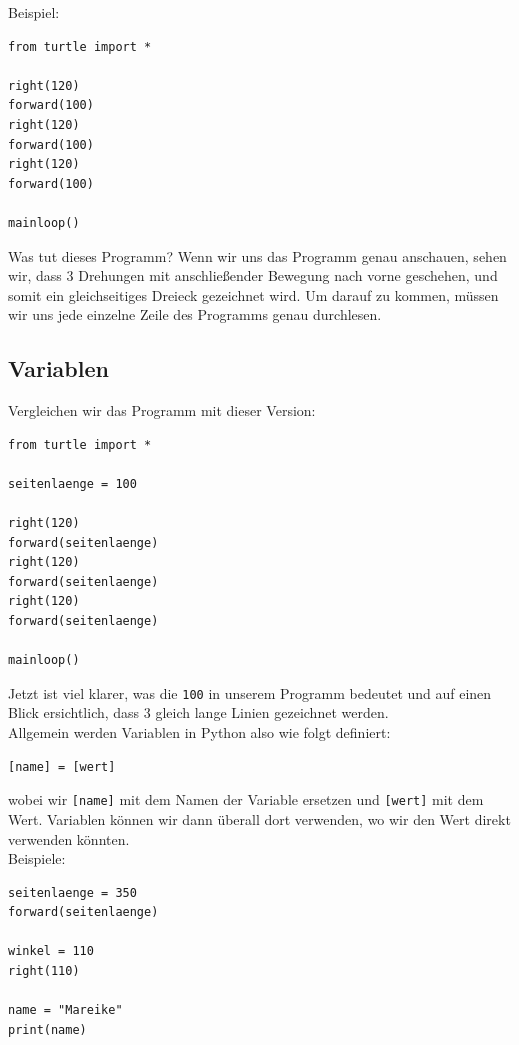 \documentclass[ngerman,11pt]{article}
\begin{document}
    Beispiel:

    \begin{lstlisting}[caption=gleichseitiges Dreieck,label={last:p2}]
from turtle import *

right(120)
forward(100)
right(120)
forward(100)
right(120)
forward(100)

mainloop()
    \end{lstlisting}

    Was tut dieses Programm?
    Wenn wir uns das Programm genau anschauen, sehen wir, dass 3 Drehungen mit anschließender
    Bewegung nach vorne geschehen, und somit ein gleichseitiges Dreieck gezeichnet wird.
    Um darauf zu kommen, müssen wir uns jede einzelne Zeile des Programms genau durchlesen. \\

    \subsection{Variablen}

    Vergleichen wir das Programm mit dieser Version:

    \begin{lstlisting}[caption=gleichseitiges Dreieck mit Variable,label={last:p3}]
from turtle import *

seitenlaenge = 100

right(120)
forward(seitenlaenge)
right(120)
forward(seitenlaenge)
right(120)
forward(seitenlaenge)

mainloop()
    \end{lstlisting}

    Jetzt ist viel klarer, was die \lstinline{100} in unserem Programm bedeutet
    und auf einen Blick ersichtlich, dass 3 gleich lange Linien gezeichnet werden. \\

    Allgemein werden Variablen in Python also wie folgt definiert:

    \begin{lstlisting}
[name] = [wert]
    \end{lstlisting}

    wobei wir \lstinline{[name]} mit dem Namen der Variable ersetzen und \lstinline{[wert]} mit dem Wert.
    Variablen können wir dann überall dort verwenden, wo wir den Wert direkt verwenden könnten. \\

    Beispiele:

    \begin{lstlisting}[caption=Variablen]
seitenlaenge = 350
forward(seitenlaenge)

winkel = 110
right(110)

name = "Mareike"
print(name)
    \end{lstlisting}
\end{document}
